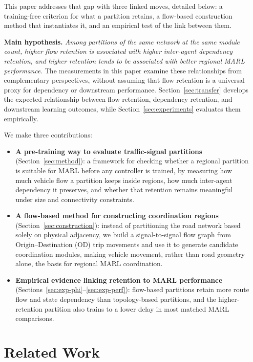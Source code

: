 \documentclass[journal]{IEEEtran}
\theoremstyle{definition}
\begin{document}
This paper addresses that gap with three linked moves, detailed below: a training-free criterion for what a partition retains, a flow-based construction method that instantiates it, and an empirical test of the link between them.

\noindent\textbf{Main hypothesis.}
\emph{Among partitions of the same network at the same module count, higher flow retention is associated with higher inter-agent dependency retention, and higher retention tends to be associated with better regional MARL performance.}
The measurements in this paper examine these relationships from complementary perspectives, without assuming that flow retention is a universal proxy for dependency or downstream performance. Section~\ref{sec:transfer} develops the expected relationship between flow retention, dependency retention, and downstream learning outcomes, while Section~\ref{sec:experiments} evaluates them empirically.

We make three contributions:
\begin{itemize}
    \item \textbf{A pre-training way to evaluate traffic-signal partitions}
          (Section~\ref{sec:method}): a framework for checking whether a
          regional partition is suitable for MARL before any controller
          is trained, by measuring how much vehicle flow a partition
          keeps inside regions, how much inter-agent dependency it
          preserves, and whether that retention remains meaningful under
          size and connectivity constraints.
    \item \textbf{A flow-based method for constructing coordination regions} (Section~\ref{sec:construction}): instead of partitioning the road network based solely on physical adjacency, we build a signal-to-signal flow graph from Origin--Destination (OD) trip movements and use it to generate candidate coordination modules, making vehicle movement, rather than road geometry alone, the basis for regional MARL coordination.
    \item \textbf{Empirical evidence linking retention to MARL performance} (Sections~\ref{sec:exp-phi}--\ref{sec:exp-perf}): flow-based partitions retain more route flow and state dependency than topology-based partitions, and the higher-retention partition also trains to a lower delay in most matched MARL comparisons.
\end{itemize}

\section{Related Work}
\label{sec:related}
\end{document}
